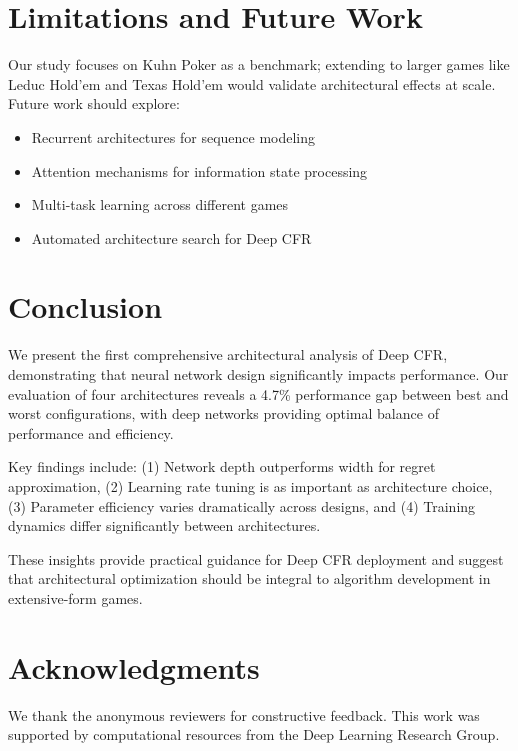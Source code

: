 \documentclass{article}
\begin{document}
\section{Limitations and Future Work}

Our study focuses on Kuhn Poker as a benchmark; extending to larger games like Leduc Hold'em and Texas Hold'em would validate architectural effects at scale. Future work should explore:

\begin{itemize}
\item Recurrent architectures for sequence modeling
\item Attention mechanisms for information state processing
\item Multi-task learning across different games
\item Automated architecture search for Deep CFR
\end{itemize}

\section{Conclusion}

We present the first comprehensive architectural analysis of Deep CFR, demonstrating that neural network design significantly impacts performance. Our evaluation of four architectures reveals a 4.7\% performance gap between best and worst configurations, with deep networks providing optimal balance of performance and efficiency.

Key findings include: (1) Network depth outperforms width for regret approximation, (2) Learning rate tuning is as important as architecture choice, (3) Parameter efficiency varies dramatically across designs, and (4) Training dynamics differ significantly between architectures.

These insights provide practical guidance for Deep CFR deployment and suggest that architectural optimization should be integral to algorithm development in extensive-form games.

\section*{Acknowledgments}
We thank the anonymous reviewers for constructive feedback. This work was supported by computational resources from the Deep Learning Research Group.




\appendix
\end{document}
